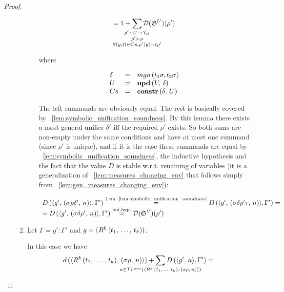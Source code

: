 \begin{proof}
\begin{enumerate}
\begin{enumerate}
\begin{enumerate}
	\[ = 1 +
      \smashoperator{\sum\limits_{\substack{ \rho' \colon U \to \grterms \\
                                      \rho' \succ \rho \\
                                      \forall (y, t) \in Cs, \rho'(y) = t \rho'  }}}
           \mathcal{D}(\schemewithvset{\mathfrak{S}}{U})(\rho')  \]
           
    		where
    
    \[ \begin{array}{lcl}
    \delta & = & mgu\,(t_1 \sigma, t_2 \sigma) \\
    U & = & \mbox{\textbf{upd}}\,(V,\, \delta) \\
    Cs & = & \mbox{\textbf{constr}}\,(\delta,\, U) \\
	\end{array} \]
	
			The left summands are obviously equal. The rest is basically covered by \lemmaword~\ref{lem:symbolic_unification_soundness}. By this lemma there exists a most general unifier $\delta'$ iff the required $\rho'$ exists. So both sums are non-empty under the same conditions and have at most one summand (since $\rho'$ is unique), and if it is the case these summands are equal by \lemmaword~\ref{lem:symbolic_unification_soundness}, the inductive hypothesis and the fact that the value $D$ is stable w.r.t. renaming of variables (it is a generalization of \lemmaword~\ref{lem:measures_changing_env} that follows simply from \lemmaword~\ref{lem:gen_measures_changing_env}):
	
\[ \begin{array}{l}
D\,(\langle g' ,\, (\sigma \rho \delta' ,\, n) \rangle, \Gamma') \stackrel{\text{Lem.~\ref{lem:symbolic_unification_soundness}}}{=} D\,(\langle g' ,\, (\sigma \delta \rho' \tau ,\, n) \rangle, \Gamma') = \\
= D\,(\langle g' ,\, (\sigma \delta \rho' ,\, n) \rangle, \Gamma') \stackrel{\text{ind.hyp.}}{=} \mathcal{D}({\mathfrak{S}}^{U})(\rho')
\end{array} \] 

	\end{enumerate}
	
	\item Let $\Gamma = g' : \Gamma'$ and $g = (R^k\,(t_1, \, \dots, \, t_k))$.
	
	In this case we have \[ d\,(\taskst{\invokegoal{R^k}{t_1}{t_k}}{\mkenv{\sigma\rho}{n}}) + \smashoperator{\sum\limits_{a \in \tra{\taskst{\invokegoal{R^k}{t_1}{t_k}}{\mkenv{\sigma\rho}{n}}}}} D\,(\taskst{g'}{a}, \Gamma') = \]
	

\end{enumerate}
\end{enumerate}
\end{proof}
